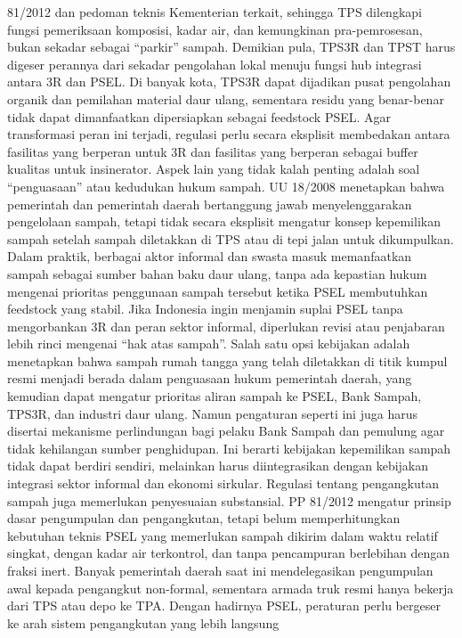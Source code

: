 \documentclass[
  letterpaper,
  DIV=11,
  numbers=noendperiod]{scrreprt}
\begin{document}
81/2012 dan pedoman teknis Kementerian terkait, sehingga TPS dilengkapi
fungsi pemeriksaan komposisi, kadar air, dan kemungkinan pra-pemrosesan,
bukan sekadar sebagai ``parkir'' sampah. Demikian pula, TPS3R dan TPST
harus digeser perannya dari sekadar pengolahan lokal menuju fungsi hub
integrasi antara 3R dan PSEL. Di banyak kota, TPS3R dapat dijadikan
pusat pengolahan organik dan pemilahan material daur ulang, sementara
residu yang benar-benar tidak dapat dimanfaatkan dipersiapkan sebagai
feedstock PSEL. Agar transformasi peran ini terjadi, regulasi perlu
secara eksplisit membedakan antara fasilitas yang berperan untuk 3R dan
fasilitas yang berperan sebagai buffer kualitas untuk insinerator. Aspek
lain yang tidak kalah penting adalah soal ``penguasaan'' atau kedudukan
hukum sampah. UU 18/2008 menetapkan bahwa pemerintah dan pemerintah
daerah bertanggung jawab menyelenggarakan pengelolaan sampah, tetapi
tidak secara eksplisit mengatur konsep kepemilikan sampah setelah sampah
diletakkan di TPS atau di tepi jalan untuk dikumpulkan. Dalam praktik,
berbagai aktor informal dan swasta masuk memanfaatkan sampah sebagai
sumber bahan baku daur ulang, tanpa ada kepastian hukum mengenai
prioritas penggunaan sampah tersebut ketika PSEL membutuhkan feedstock
yang stabil. Jika Indonesia ingin menjamin suplai PSEL tanpa
mengorbankan 3R dan peran sektor informal, diperlukan revisi atau
penjabaran lebih rinci mengenai ``hak atas sampah''. Salah satu opsi
kebijakan adalah menetapkan bahwa sampah rumah tangga yang telah
diletakkan di titik kumpul resmi menjadi berada dalam penguasaan hukum
pemerintah daerah, yang kemudian dapat mengatur prioritas aliran sampah
ke PSEL, Bank Sampah, TPS3R, dan industri daur ulang. Namun pengaturan
seperti ini juga harus disertai mekanisme perlindungan bagi pelaku Bank
Sampah dan pemulung agar tidak kehilangan sumber penghidupan. Ini
berarti kebijakan kepemilikan sampah tidak dapat berdiri sendiri,
melainkan harus diintegrasikan dengan kebijakan integrasi sektor
informal dan ekonomi sirkular. Regulasi tentang pengangkutan sampah juga
memerlukan penyesuaian substansial. PP 81/2012 mengatur prinsip dasar
pengumpulan dan pengangkutan, tetapi belum memperhitungkan kebutuhan
teknis PSEL yang memerlukan sampah dikirim dalam waktu relatif singkat,
dengan kadar air terkontrol, dan tanpa pencampuran berlebihan dengan
fraksi inert. Banyak pemerintah daerah saat ini mendelegasikan
pengumpulan awal kepada pengangkut non-formal, sementara armada truk
resmi hanya bekerja dari TPS atau depo ke TPA. Dengan hadirnya PSEL,
peraturan perlu bergeser ke arah sistem pengangkutan yang lebih langsung
\end{document}
